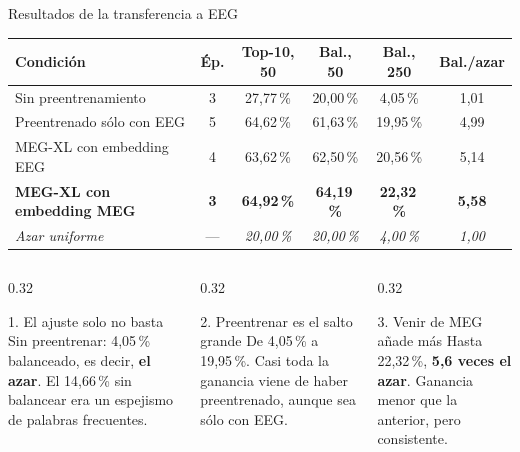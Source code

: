 \documentclass[aspectratio=169,10pt]{beamer}
\newcommand{\term}[1]{\textbf{\color{deepgreen}#1}}
\begin{document}
\begin{frame}[c]{Resultados de la transferencia a EEG}
  \centering
  \small
  \renewcommand{\arraystretch}{1.3}
  \setlength{\tabcolsep}{6pt}
  \begin{tabular}{lccccc}
    \toprule
    \textbf{Condición} & \textbf{Ép.} & \textbf{Top-10, 50} & \textbf{Bal., 50} & \textbf{Bal., 250} & \textbf{Bal./azar} \\
    \midrule
    Sin preentrenamiento & 3 & 27,77\,\% & 20,00\,\% & 4,05\,\% & 1,01 \\
    Preentrenado sólo con EEG & 5 & 64,62\,\% & 61,63\,\% & 19,95\,\% & 4,99 \\
    MEG-XL con embedding EEG & 4 & 63,62\,\% & 62,50\,\% & 20,56\,\% & 5,14 \\
    \textbf{MEG-XL con embedding MEG} & \textbf{3} & \textbf{64,92\,\%} & \textbf{64,19\,\%} & \textbf{22,32\,\%} & \textbf{5,58} \\
    \midrule
    \emph{Azar uniforme} & --- & \emph{20,00\,\%} & \emph{20,00\,\%} & \emph{4,00\,\%} & \emph{1,00} \\
    \bottomrule
  \end{tabular}
  \vspace{4mm}
  \begin{columns}[t,totalwidth=\linewidth]
    \begin{column}{0.32\linewidth}
      \begin{block}{1. El ajuste solo no basta}
        \footnotesize Sin preentrenar: 4,05\,\% balanceado, es decir, \term{el azar}. El 14,66\,\% sin balancear era un espejismo de palabras frecuentes.
      \end{block}
    \end{column}
    \begin{column}{0.32\linewidth}
      \begin{block}{2. Preentrenar es el salto grande}
        \footnotesize De 4,05\,\% a 19,95\,\%. Casi toda la ganancia viene de haber preentrenado, aunque sea sólo con EEG.
      \end{block}
    \end{column}
    \begin{column}{0.32\linewidth}
      \begin{block}{3. Venir de MEG añade más}
        \footnotesize Hasta 22,32\,\%, \term{5,6 veces el azar}. Ganancia menor que la anterior, pero consistente.
      \end{block}
    \end{column}
  \end{columns}
\end{frame}
\end{document}
